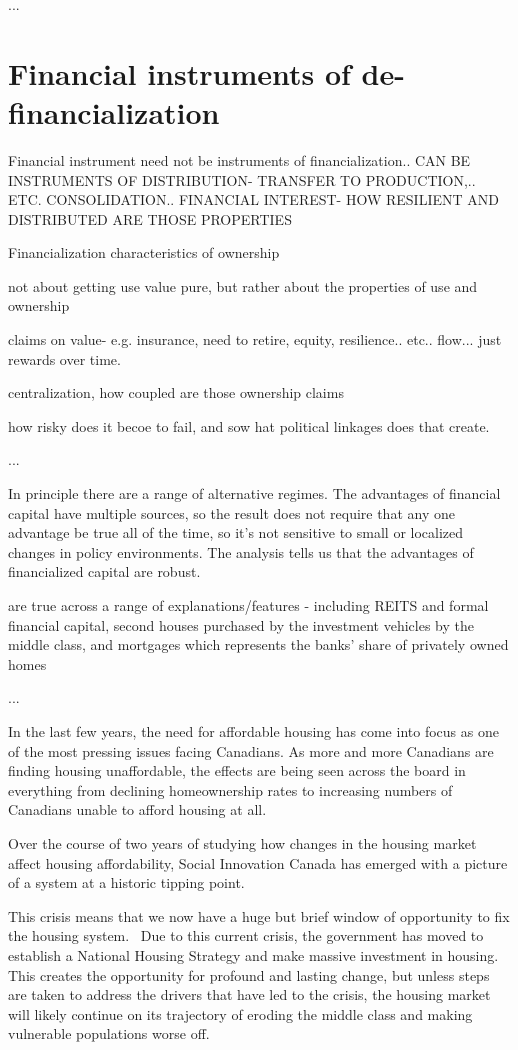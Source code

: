...

\section{Financial instruments of de-financialization}
Financial instrument need not be instruments of financialization..
CAN BE INSTRUMENTS OF DISTRIBUTION- TRANSFER TO PRODUCTION,.. ETC. CONSOLIDATION.. FINANCIAL INTEREST- HOW RESILIENT AND DISTRIBUTED ARE THOSE PROPERTIES

Financialization
characteristics of ownership

not about getting use value pure, but rather about the properties of use and ownership

claims on value- e.g. insurance, need to retire, equity, resilience.. etc.. flow... just rewards over time.

centralization, 
how coupled are those ownership claims

how risky does it becoe to fail, and sow hat political linkages does that create. 


...

In principle there are a range of alternative regimes.
The advantages of financial capital have multiple sources, so the result does not require that any one advantage be true all of the time, so it's not sensitive to small or localized changes in policy environments. The analysis tells us that the advantages of financialized capital are robust.

are true across a range of explanations/features - including REITS and formal financial capital, second houses purchased by the investment vehicles by the middle class, and mortgages which represents the banks' share of privately owned homes

...


In the last few years, the need for affordable housing has come into focus as one of the most pressing issues facing Canadians. As more and more Canadians are finding housing unaffordable, the effects are being seen across the board in everything from declining homeownership rates to increasing numbers of Canadians unable to afford housing at all.

Over the course of two years of studying how changes in the housing market affect housing affordability, Social Innovation Canada has emerged with a picture of a system at a historic tipping point. 

This crisis means that we now have a huge but brief window of opportunity to fix the housing system.  Due to this current crisis, the government has moved to establish a National Housing Strategy and make massive investment in housing. This creates the opportunity for profound and lasting change, but unless steps are taken to address the drivers that have led to the crisis, the housing market will likely continue on its trajectory of eroding the middle class and making vulnerable populations worse off.   

